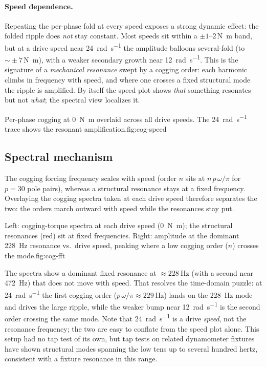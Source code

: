 \documentclass[11pt]{article}
\begin{document}
\paragraph{Speed dependence.} Repeating the per-phase fold at every speed
exposes a strong dynamic effect: the folded ripple does \emph{not} stay constant.
Most speeds sit within a $\pm 1\text{--}2$\,\si{\newton\meter} band, but at a drive
speed near \SI{24}{\radian\per\second} the amplitude balloons several-fold (to
$\sim\!\pm 7$\,\si{\newton\meter}), with a weaker secondary growth near
\SI{12}{\radian\per\second}. This is the signature of a \emph{mechanical
resonance} swept by a cogging order: each harmonic climbs in frequency with speed,
and where one crosses a fixed structural mode the ripple is amplified. By itself
the speed plot shows \emph{that} something resonates but not \emph{what}; the
spectral view localizes it.

  {Per-phase cogging at \SI{0}{\newton\meter} overlaid across all drive speeds.
   The \SI{24}{\radian\per\second} trace shows the resonant amplification.}{fig:cog-speed}

\subsection{Spectral mechanism}\label{sec:fft}
The cogging forcing frequency scales with speed (order $n$ sits at
$n\,p\,\omega/\pi$ for $p=30$ pole pairs), whereas a structural resonance stays at
a fixed frequency. Overlaying the cogging spectra taken at each drive speed
therefore separates the two: the orders march outward with speed while the
resonances stay put.

  {Left: cogging-torque spectra at each drive speed (\SI{0}{\newton\meter}); the
   structural resonances (red) sit at fixed frequencies. Right: amplitude at the
   dominant \SI{228}{\hertz} resonance vs.\ drive speed, peaking where a low cogging
   order ($n$) crosses the mode.}{fig:cog-fft}

The spectra show a dominant fixed resonance at \textbf{$\approx\SI{228}{\hertz}$}
(with a second near \SI{472}{\hertz}) that does not move with speed. That resolves
the time-domain puzzle: at \SI{24}{\radian\per\second} the first cogging
order ($p\,\omega/\pi \approx \SI{229}{\hertz}$) lands on the \SI{228}{\hertz}
mode and drives the large ripple, while the weaker bump near
\SI{12}{\radian\per\second} is the second order crossing the same mode. Note that
\SI{24}{\radian\per\second} is a drive \emph{speed}, not the resonance frequency;
the two are easy to conflate from the speed plot alone. This setup had no tap test
of its own, but tap tests on related dynamometer fixtures have shown structural
modes spanning the low tens up to several hundred hertz, consistent with a fixture
resonance in this range.
\end{document}
